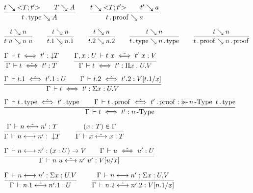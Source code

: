 \documentclass[a4paper,english]{lipics-utf8x}
\begin{document}
  \begin{center}
  \(
    \ru{t \rew {<}T;t'{>} \qquad
        T \rew A
      }{t \gettype \rew A}
    \qquad
    \ru{t \rew {<}T;t'{>} \qquad
        t' \rew a
      }{t \getproof \rew a}
  \)
  \end{center}

  \begin{center}
  \(
    \ru{t \rew n
      }{t~u \rew n~u}
    \qquad
    \ru{t \rew n
      }{t.1 \rew n.1}
    \qquad
    \ru{t \rew n
      }{t.2 \rew n.2}
    \qquad
    \ru{t \rew n
      }{t \gettype \rew n \gettype}
    \qquad
    \ru{t \rew n
      }{t \getproof \rew n \getproof}
  \)
  \end{center}


  \begin{center}
  \(
    \ru{\Gamma \der t \iff t' : \red T
      }{\Gamma \der t \hiff t' : T}
    \qquad
    \ru{\Gamma, x:U \der t~x \hiff t'~x : V
      }{\Gamma \der t \iff t' : \Pi x:U.V}
  \)
  \end{center}

  \begin{center}
  \(
    \ru{\Gamma \der t.1 \hiff t'.1 : U \qquad
        \Gamma \der t.2 \hiff t'.2 : V[t.1/x]
      }{\Gamma \der t \iff t' : \Sigma x:U.V}
  \)
  \end{center}

  \begin{center}
  \(
    \ru{\Gamma \der t \gettype \hiff t' \gettype \qquad
        \Gamma \der t \getproof \hiff t' \getproof : \isnType{n}{t \gettype}
      }{\Gamma \der t \iff t' : \nType{n}}
  \)
  \end{center}


  \begin{center}
  \(
    \ru{\Gamma \der n \hsteq n' : T
      }{\Gamma \der n \steq n' :\ \red T}
    \qquad
    \ru{(x:T) \in \Gamma
      }{\Gamma \der x \hsteq x : T}
  \)
  \end{center}

  \begin{center}
  \(
    \ru{\Gamma \der n \steq n' : (x:U) \to V \qquad
        \Gamma \der u \hiff u' : U
      }{\Gamma \der n~u \hsteq n'~u' : V[u/x]}
  \)
  \end{center}

  \begin{center}
  \(
    \ru{\Gamma \der n \steq n' : \Sigma x:U.V
      }{\Gamma \der n.1 \hsteq n'.1 : U}
    \qquad
    \ru{\Gamma \der n \steq n' : \Sigma x:U.V
      }{\Gamma \der n.2 \hsteq n'.2 : V[n.1/x]}
  \)
  \end{center}
\end{document}
